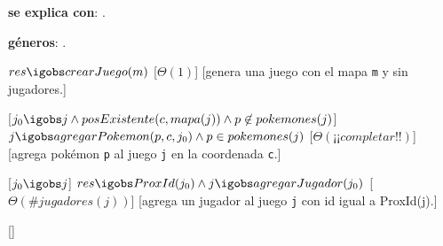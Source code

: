 \begin{Interfaz}


  \textbf{se explica con}: .

  \textbf{g\'eneros}: .



  {$res \igobs crearJuego(m)$}%
  [$\Theta(1)$]
  [genera una juego con el mapa \texttt{m} y sin jugadores.]


  [$j_0 \igobs j \land posExistente(c, mapa(j)) \land p \not \in pokemones(j) $]  
  {$j \igobs agregarPokemon(p, c, j_0)  \land p \in pokemones(j)$}
  [$\Theta(¡¡completar!!)$]
  [agrega pok\'emon \texttt{p} al juego \texttt{j} en la coordenada \texttt{c}.]


  [$ j_0 \igobs j $]
  {$res \igobs ProxId(j_0) \land j \igobs agregarJugador(j_0)$}%
  [$\Theta(\# jugadores(j))$]
  [agrega un jugador al juego \texttt{j} con id igual a ProxId(j).]



\end{Interfaz}

\begin{Representacion}
 
  \begin{Estructura}{}[]
  \end{Estructura}


  

  \AbsFc[]{}

\end{Representacion}

\begin{Algoritmos}
  
\end{Algoritmos}